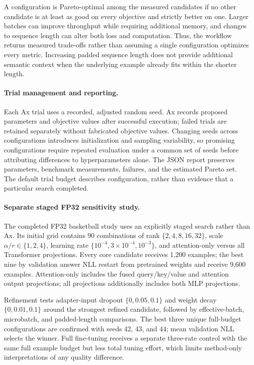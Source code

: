 A configuration is Pareto-optimal among the measured candidates if no other candidate is at least as good on every objective and strictly better on one. Larger batches can improve throughput while requiring additional memory, and changes to sequence length can alter both loss and computation. Thus, the workflow returns measured trade-offs rather than assuming a single configuration optimizes every metric. Increasing padded sequence length does not provide additional semantic context when the underlying example already fits within the shorter length.

\paragraph{Trial management and reporting.}
Each Ax trial uses a recorded, adjusted random seed. Ax records proposed parameters and objective values after successful execution; failed trials are retained separately without fabricated objective values. Changing seeds across configurations introduces initialization and sampling variability, so promising configurations require repeated evaluation under a common set of seeds before attributing differences to hyperparameters alone. The JSON report preserves parameters, benchmark measurements, failures, and the estimated Pareto set. The default trial budget describes configuration, rather than evidence that a particular search completed.

\paragraph{Separate staged FP32 sensitivity study.}
The completed FP32 basketball study uses an explicitly staged search rather than Ax. Its initial grid contains 90 combinations of rank $\{2,4,8,16,32\}$, scale $\alpha/r\in\{1,2,4\}$, learning rate $\{10^{-4},3\times10^{-4},10^{-3}\}$, and attention-only versus all Transformer projections. Every core candidate receives 1,200 examples; the best nine by validation answer NLL restart from pretrained weights and receive 9,600 examples. Attention-only includes the fused query/key/value and attention output projections; all projections additionally includes both MLP projections.

Refinement tests adapter-input dropout $\{0,0.05,0.1\}$ and weight decay $\{0,0.01,0.1\}$ around the strongest refined candidate, followed by effective-batch, microbatch, and padded-length comparisons. The best three unique full-budget configurations are confirmed with seeds 42, 43, and 44; mean validation NLL selects the winner. Full fine-tuning receives a separate three-rate control with the same full example budget but less total tuning effort, which limits method-only interpretations of any quality difference.

